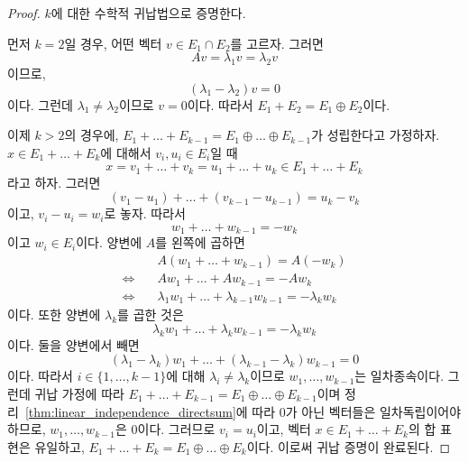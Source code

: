 \documentclass[unfonts,oneside,a4paper]{oblivoir}
\theoremstyle{definition}
\theoremstyle{theorem}
\theoremstyle{theorem}
\theoremstyle{remark}
\theoremstyle{remark}
\theoremstyle{remark}
\theoremstyle{remark}
\renewcommand{\vec}[1]{\bm{\mathit{#1}}}
\newcommand{\vecz}{\bm{\mathrm{0}}}
\begin{document}
\begin{proof}
    $k$에 대한 수학적 귀납법으로 증명한다.

    먼저 $k = 2$일 경우, 어떤 벡터 $\vec v \in E_1 \cap E_2$를 고르자.
    그러면
    \begin{equation*}
        A \vec v = \lambda_1 \vec v = \lambda_2 \vec v
    \end{equation*}
    이므로,
    \begin{equation*}
        (\lambda_1 - \lambda_2) \vec v = \vecz
    \end{equation*}
    이다.
    그런데 $\lambda_1 \neq \lambda_2$이므로 $\vec v = \vecz$이다.
    따라서 $E_1 + E_2 = E_1 \oplus E_2$이다.

    이제 $k > 2$의 경우에, $E_1 + \dots + E_{k - 1} = E_1 \oplus \dots \oplus E_{k - 1}$가 성립한다고 가정하자.
    $\vec x \in E_1 + \dots + E_k$에 대해서 $\vec v_i, \vec u_i \in E_i$일 때
    \begin{equation*}
        \vec x = \vec v_1 + \dots + \vec v_k = \vec u_1 + \dots + \vec u_k \in E_1 + \dots + E_k
    \end{equation*}
    라고 하자.
    그러면
    \begin{equation*}
        (\vec v_1 - \vec u_1) + \dots + (\vec v_{k - 1} - \vec u_{k - 1}) = \vec u_k - \vec v_k
    \end{equation*}
    이고, $\vec v_i - \vec u_i = \vec w_i$로 놓자.
    따라서
    \begin{equation*}
        \vec w_1 + \dots + \vec w_{k - 1} = -\vec w_k
    \end{equation*}
    이고 $\vec w_i \in E_i$이다.
    양변에 $A$를 왼쪽에 곱하면
    \begin{align*}
        &A(\vec w_1 + \dots + \vec w_{k - 1}) = A(-\vec w_k)\\
        \Leftrightarrow\quad &A \vec w_1 + \dots + A \vec w_{k - 1} = -A \vec w_k\\
        \Leftrightarrow\quad &\lambda_1 \vec w_1 + \dots + \lambda_{k - 1} \vec w_{k - 1} = - \lambda_k \vec w_k
    \end{align*}
    이다.
    또한 양변에 $\lambda_k$를 곱한 것은
    \begin{equation*}
        \lambda_k \vec w_1 + \dots + \lambda_k \vec w_{k - 1} = -\lambda_k \vec w_k
    \end{equation*}
    이다.
    둘을 양변에서 빼면
    \begin{equation*}
        (\lambda_1 - \lambda_k) \vec w_1 + \dots + (\lambda_{k - 1} - \lambda_k) \vec w_{k - 1} = \vecz
    \end{equation*}
    이다.
    따라서 $i \in \{1, \dots, k - 1\}$에 대해 $\lambda_i \neq \lambda_k$이므로 $\vec w_1, \dots, \vec w_{k - 1}$는 일차종속이다.
    그런데 귀납 가정에 따라 $E_1 + \dots + E_{k - 1} = E_1 \oplus \dots \oplus E_{k - 1}$이며 정리~\ref{thm:linear_independence_directsum}에 따라 $\vecz$가 아닌 벡터들은 일차독립이어야 하므로, $\vec w_1, \dots, \vec w_{k - 1}$은 $\vecz$이다.
    그러므로 $\vec v_i = \vec u_i$이고, 벡터 $\vec x \in E_1 + \dots + E_k$의 합 표현은 유일하고, $E_1 + \dots + E_k = E_1 \oplus \dots \oplus E_k$이다.
    이로써 귀납 증명이 완료된다.
\end{proof}
\end{document}
